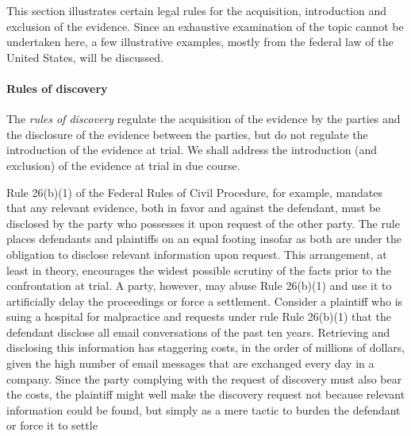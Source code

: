 \documentclass[10pt]{article}
\begin{document}
This section illustrates certain legal rules for the acquisition, introduction and exclusion of the evidence. Since an exhaustive examination of the topic cannot be undertaken here, a few illustrative examples, mostly from the federal law of the United States, will be discussed. 




\paragraph{Rules of discovery}
The \textit{rules of discovery} %
regulate the acquisition of the evidence by the parties and the disclosure 
of the evidence between the parties, but do not regulate the introduction of the evidence at trial. %
We shall address the introduction (and exclusion) of the evidence at trial in due course. 
 
 
 
 Rule 26(b)(1) of the Federal Rules of Civil Procedure, for example, mandates that any relevant evidence, both in favor and against the defendant, must be disclosed by the party who possesses it upon request of the other party. The rule places defendants and plaintiffs on an equal footing insofar as both are under the obligation to disclose relevant information upon request. This arrangement, at least in theory, 
 encourages the widest possible scrutiny of the facts prior to the confrontation at trial. %
 A party, however, may abuse Rule 26(b)(1) and use it to artificially delay the proceedings or force a settlement. 
Consider a plaintiff who is suing a hospital for malpractice and requests under rule Rule 26(b)(1) that the defendant 
disclose all email conversations of the past ten years. Retrieving and disclosing this information has staggering costs, in the order of millions of dollars, given the high number of email messages that are exchanged every day in a company. Since the party complying with the request of discovery must also bear the costs, the plaintiff might well make the discovery request not because relevant information could be found, 
but simply as a mere tactic to burden the defendant or force it to settle \citep{Beisner2010}
\end{document}
